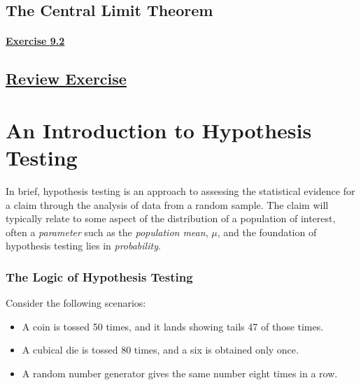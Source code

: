 \documentclass[
  11pt,
]{book}
\begin{document}
\section{The Central Limit Theorem}\label{the-central-limit-theorem}

\subsubsection*{\texorpdfstring{\hyperref[ex92a]{Exercise 9.2}}{Exercise 9.2}}\label{exercise-9.2}

\section*{\texorpdfstring{\hyperref[re9a]{Review Exercise}}{Review Exercise}}\label{review-exercise-8}

\chapter{An Introduction to Hypothesis Testing}\label{an-introduction-to-hypothesis-testing}

In brief, hypothesis testing is an approach to assessing the statistical evidence for a claim through the analysis of data from a random sample. The claim will typically relate to some aspect of the distribution of a population of interest, often a \emph{parameter} such as the \emph{population mean}, \(\mu\), and the foundation of hypothesis testing lies in \emph{probability}.

\subsection*{The Logic of Hypothesis Testing}\label{the-logic-of-hypothesis-testing}

Consider the following scenarios:

\begin{itemize}
    \item A coin is tossed 50 times, and it lands showing tails 47 of those times.
    \item A cubical die is tossed 80 times, and a six is obtained only once.
    \item A random number generator gives the same number eight times in a row.
\end{itemize}
\end{document}

